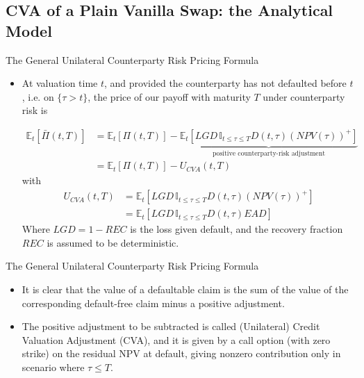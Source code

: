 \documentclass[11pt]{beamer}
\begin{document}
\subsection{CVA of a Plain Vanilla Swap: the Analytical Model}
\begin{frame}{The General Unilateral Counterparty Risk Pricing Formula}
\begin{itemize}
\item At valuation time $t$, and provided the counterparty has not defaulted before $t$, i.e. on $\{ \tau > t \}$, the price of our payoff with maturity $T$ under counterparty risk is

\begin{equation}
\begin{split}
\mathbb{E}_t [\bar \Pi (t, T) ] &=  \mathbb{E}_t [\Pi (t, T) ]  - 
\underbrace{
\mathbb{E}_t [ LGD \, \mathbb{I}_{t \le \tau \le T} D(t, \tau) (NPV(\tau))^+ ]  
}_\text{positive counterparty-risk adjustment} \\
&= \mathbb{E}_t [\Pi (t, T) ]  - U_{CVA}(t,T)
\end{split}
\end{equation}
with
\begin{equation}
\begin{split}
U_{CVA}(t,T) &= \mathbb{E}_t [ LGD \, \mathbb{I}_{t \le \tau \le T} D(t, \tau) (NPV(\tau))^+ ] \\
&= \mathbb{E}_t [ LGD \, \mathbb{I}_{t \le \tau \le T} D(t, \tau) EAD ]
\end{split}
\end{equation}
Where $LGD = 1 - REC$ is the loss given default, and the recovery fraction $REC$ is assumed to be deterministic. 
\end{itemize}
\end{frame}
\begin{frame}{The General Unilateral Counterparty Risk Pricing Formula}
\begin{itemize}
\item It is clear that the value of a defaultable claim is the sum of the value of the corresponding default-free claim minus a positive adjustment. 
\item The positive adjustment to be subtracted is called (Unilateral) Credit Valuation Adjustment (CVA), and it is given by a call option (with zero strike) on the residual NPV at default, giving nonzero contribution only in scenario where $\tau \le T$.
\end{itemize}
\end{frame}
\end{document}
